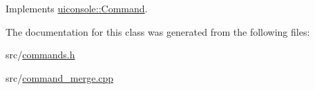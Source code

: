 Implements \hyperlink{classuiconsole_1_1Command_a5c4d205b1de13a6b3d0db73ddc7ebefa}{uiconsole::Command}.



The documentation for this class was generated from the following files:\begin{DoxyCompactItemize}
\item 
src/\hyperlink{commands_8h}{commands.h}\item 
src/\hyperlink{command__merge_8cpp}{command\_\-merge.cpp}\end{DoxyCompactItemize}
